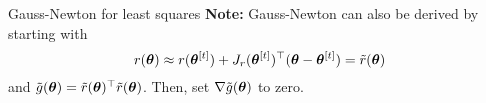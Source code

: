 \documentclass[11pt,compress,t,notes=noshow, xcolor=table]{beamer}
\begin{document}
\begin{vbframe}{Gauss-Newton for least squares}
\textbf{Note:} Gauss-Newton can also be derived by starting with
\begin{equation*}
    r(\bm{\theta}) \approx r(\bm{\theta}^{[t]}) + J_r(\bm{\theta}^{[t]})^\top (\bm{\theta} - \bm{\theta}^{[t]}) = \tilde{r}(\bm{\theta})
\end{equation*}
and $\tilde{g}(\bm{\theta}) = \tilde{r}(\bm{\theta})^\top \tilde{r}(\bm{\theta})$.
Then, set $\nabla \tilde{g}(\bm{\theta})$ to zero.








\end{vbframe}
\end{document}
